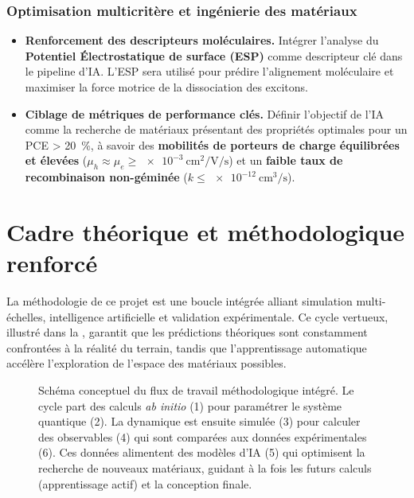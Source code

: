 \documentclass[12pt, a4paper]{article}
\begin{document}
\subsubsection{Optimisation multicritère et ingénierie des matériaux}
\begin{itemize}
    \item \textbf{Renforcement des descripteurs moléculaires.} Intégrer l'analyse du \textbf{Potentiel Électrostatique de surface (ESP)} comme descripteur clé dans le pipeline d'IA. L'ESP sera utilisé pour prédire l'alignement moléculaire et maximiser la force motrice de la dissociation des excitons.
    \item \textbf{Ciblage de métriques de performance clés.} Définir l'objectif de l'IA comme la recherche de matériaux présentant des propriétés optimales pour un PCE > \SI{20}{\percent}, à savoir des \textbf{mobilités de porteurs de charge équilibrées et élevées} ($\mu_h \approx \mu_e \geq \SI{e-3}{\centi\meter\squared\per\volt\per\second}$) et un \textbf{faible taux de recombinaison non-géminée} ($k \leq \SI{e-12}{\centi\meter\cubed\per\second}$).
\end{itemize}

\section{Cadre théorique et méthodologique renforcé}

La méthodologie de ce projet est une boucle intégrée alliant simulation multi-échelles, intelligence artificielle et validation expérimentale. Ce cycle vertueux, illustré dans la , garantit que les prédictions théoriques sont constamment confrontées à la réalité du terrain, tandis que l'apprentissage automatique accélère l'exploration de l'espace des matériaux possibles.

\begin{figure}[htb]
\centering
\caption{Schéma conceptuel du flux de travail méthodologique intégré. Le cycle part des calculs \textit{ab initio} (1) pour paramétrer le système quantique (2). La dynamique est ensuite simulée (3) pour calculer des observables (4) qui sont comparées aux données expérimentales (6). Ces données alimentent des modèles d'IA (5) qui optimisent la recherche de nouveaux matériaux, guidant à la fois les futurs calculs (apprentissage actif) et la conception finale.}
\label{fig_workflow_methodo}
\medspace

\end{figure}
\end{document}
